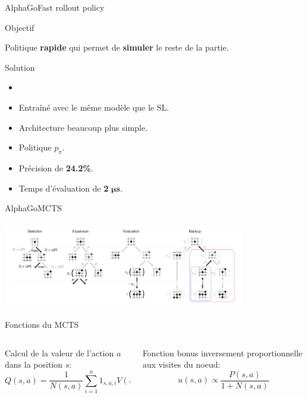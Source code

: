 \begin{frame}{AlphaGo}{Fast rollout policy}
    \begin{block}{Objectif}
        \begin{center}
            Politique \textbf{rapide} qui permet de \textbf{simuler} le reste de la partie.
        \end{center}
    \end{block}
    \begin{block}{Solution}
        \begin{itemize}
            \item
            \item Entraîné avec le même modèle que le SL.
            \item Architecture beaucoup plus simple.
            \item Politique $p_\pi$.
            \item Précision de \textbf{24.2\%}.
            \item Temps d'évaluation de \textbf{2} $\boldsymbol{\mu s}$.
        \end{itemize}
    \end{block}
\end{frame}


\begin{frame}{AlphaGo}{MCTS}
    \begin{center}
        \includegraphics[width=10.5cm, height=3.8cm]{ressources/AlphaGo/MCTS_AlphaGo}
        \begin{block}{ Fonctions du MCTS }
            \begin{columns}[t]
                \begin{column}{0.45\textwidth}
                    Calcul de la valeur de l'action $a$ dans la position $s$:
                    $$Q(s,a) = \frac{1}{N(s,a)}\sum\limits_{i=1}^{n} 1_{s,a,i} V(s_L)$$

                \end{column}
                \begin{column}{0.45\textwidth}
                    Fonction bonus inversement proportionnelle aux visites du noeud:
                    $$u(s,a) \propto \frac{P(s,a)}{1+N(s,a)}$$
                \end{column}
            \end{columns}
        \end{block}
    \end{center}
\end{frame}

